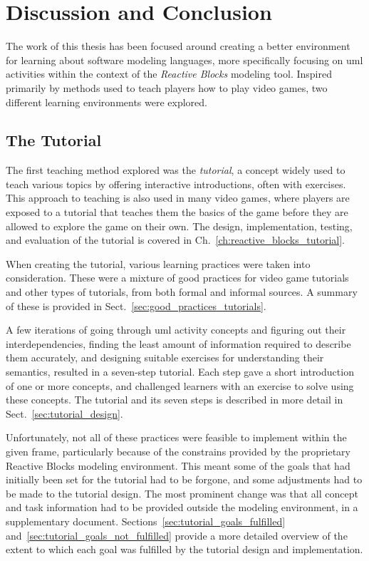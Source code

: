 \chapter{Discussion and Conclusion}
\label{ch:discussion}
The work of this thesis has been focused around creating a better environment for learning about software modeling languages, more specifically focusing on \gls{uml} activities within the context of the \emph{Reactive Blocks} modeling tool. Inspired primarily by methods used to teach players how to play video games, two different learning environments were explored.

\section{The Tutorial}
\label{sec:discussion_tutorial}
The first teaching method explored was the \emph{tutorial}, a concept widely used to teach various topics by offering interactive introductions, often with exercises. This approach to teaching is also used in many video games, where players are exposed to a tutorial that teaches them the basics of the game before they are allowed to explore the game on their own. The design, implementation, testing, and evaluation of the tutorial is covered in Ch.~\ref{ch:reactive_blocks_tutorial}.

\noindent
When creating the tutorial, various learning practices were taken into consideration. These were a mixture of good practices for video game tutorials and other types of tutorials, from both formal and informal sources. A summary of these is provided in Sect.~\ref{sec:good_practices_tutorials}.

\noindent
A few iterations of going through \gls{uml} activity concepts and figuring out their interdependencies, finding the least amount of information required to describe them accurately, and designing suitable exercises for understanding their semantics, resulted in a seven-step tutorial. Each step gave a short introduction of one or more concepts, and challenged learners with an exercise to solve using these concepts. The tutorial and its seven steps is described in more detail in Sect.~\ref{sec:tutorial_design}.

\noindent
Unfortunately, not all of these practices were feasible to implement within the given frame, particularly because of the constrains provided by the proprietary Reactive Blocks modeling environment. This meant some of the goals that had initially been set for the tutorial had to be forgone, and some adjustments had to be made to the tutorial design. The most prominent change was that all concept and task information had to be provided outside the modeling environment, in a supplementary document. Sections~\ref{sec:tutorial_goals_fulfilled} and~\ref{sec:tutorial_goals_not_fulfilled} provide a more detailed overview of the extent to which each goal was fulfilled by the tutorial design and implementation.

